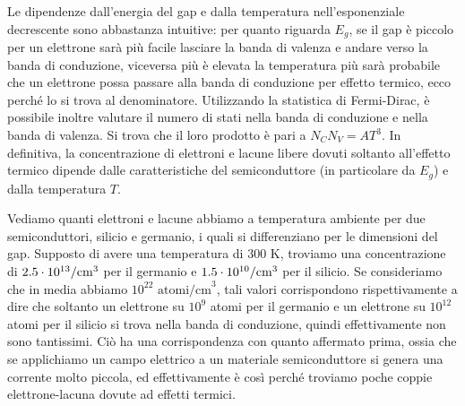 Le dipendenze dall'energia del gap e dalla temperatura nell'esponenziale decrescente sono abbastanza intuitive: per quanto riguarda $E_g$, se il gap è piccolo per un elettrone sarà più facile lasciare la banda di valenza e andare verso la banda di conduzione, viceversa più è elevata la temperatura più sarà probabile che un elettrone possa passare alla banda di conduzione per effetto termico, ecco perché lo si trova al denominatore. Utilizzando la statistica di Fermi-Dirac, è possibile inoltre valutare il numero di stati nella banda di conduzione e nella banda di valenza. Si trova che il loro prodotto è pari a $N_C N_V=AT^3$. In definitiva, la concentrazione di elettroni e lacune libere dovuti soltanto all'effetto termico dipende dalle caratteristiche del semiconduttore (in particolare da $E_g$) e dalla temperatura $T$.

Vediamo quanti elettroni e lacune abbiamo a temperatura ambiente per due semiconduttori, silicio e germanio, i quali si differenziano per le dimensioni del gap. Supposto di avere una temperatura di 300 K, troviamo una concentrazione di $2.5 \cdot 10^{13}/\rm cm^3$ per il germanio e $1.5 \cdot 10^{10}/\rm cm^3$ per il silicio. Se consideriamo che in media abbiamo $10^{22} \text{ atomi/cm}^3$, tali valori corrispondono rispettivamente a dire che soltanto un elettrone su $10^9$ atomi per il germanio e un elettrone su $10^{12}$ atomi per il silicio si trova nella banda di conduzione, quindi effettivamente non sono tantissimi. Ciò ha una corrispondenza con quanto affermato prima, ossia che se applichiamo un campo elettrico a un materiale semiconduttore si genera una corrente molto piccola, ed effettivamente è così perché troviamo poche coppie elettrone-lacuna dovute ad effetti termici.
